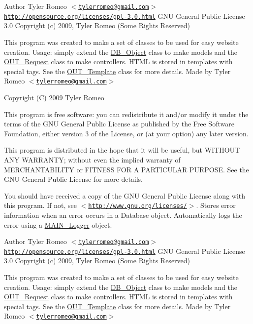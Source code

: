 \begin{DoxyAuthor}{Author}
Tyler Romeo $<$\href{mailto:tylerromeo@gmail.com}{\tt tylerromeo@gmail.com}$>$  \href{http://opensource.org/licenses/gpl-3.0.html}{\tt http://opensource.org/licenses/gpl-\/3.0.html} GNU General Public License 3.0  Copyright (c) 2009, Tyler Romeo (Some Rights Reserved)
\end{DoxyAuthor}
This program was created to make a set of classes to be used for easy website creation. Usage: simply extend the \hyperlink{classDB__Object}{DB\_\-Object} class to make models and the \hyperlink{classOUT__Request}{OUT\_\-Request} class to make controllers. HTML is stored in templates with special tags. See the \hyperlink{classOUT__Template}{OUT\_\-Template} class for more details. Made by Tyler Romeo $<$\href{mailto:tylerromeo@gmail.com}{\tt tylerromeo@gmail.com}$>$

Copyright (C) 2009 Tyler Romeo

This program is free software: you can redistribute it and/or modify it under the terms of the GNU General Public License as published by the Free Software Foundation, either version 3 of the License, or (at your option) any later version.

This program is distributed in the hope that it will be useful, but WITHOUT ANY WARRANTY; without even the implied warranty of MERCHANTABILITY or FITNESS FOR A PARTICULAR PURPOSE. See the GNU General Public License for more details.

You should have received a copy of the GNU General Public License along with this program. If not, see $<$\href{http://www.gnu.org/licenses/}{\tt http://www.gnu.org/licenses/}$>$. Stores error information when an error occurs in a Database object. Automatically logs the error using a \hyperlink{classMAIN__Logger}{MAIN\_\-Logger} object.

\begin{DoxyAuthor}{Author}
Tyler Romeo $<$\href{mailto:tylerromeo@gmail.com}{\tt tylerromeo@gmail.com}$>$  \href{http://opensource.org/licenses/gpl-3.0.html}{\tt http://opensource.org/licenses/gpl-\/3.0.html} GNU General Public License 3.0  Copyright (c) 2009, Tyler Romeo (Some Rights Reserved)
\end{DoxyAuthor}
This program was created to make a set of classes to be used for easy website creation. Usage: simply extend the \hyperlink{classDB__Object}{DB\_\-Object} class to make models and the \hyperlink{classOUT__Request}{OUT\_\-Request} class to make controllers. HTML is stored in templates with special tags. See the \hyperlink{classOUT__Template}{OUT\_\-Template} class for more details. Made by Tyler Romeo $<$\href{mailto:tylerromeo@gmail.com}{\tt tylerromeo@gmail.com}$>$

